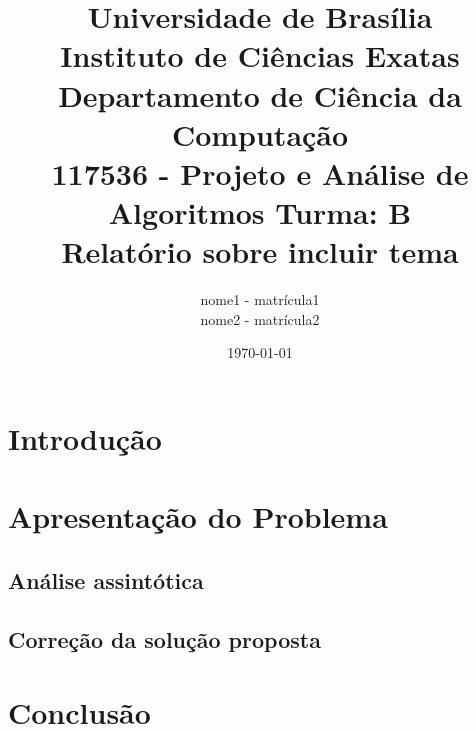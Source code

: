 \documentclass[12pt]{article}
\title{{\large Universidade de Brasília \\ Instituto de Ciências Exatas \\
Departamento de Ciência da Computação} \\[1cm]
117536 - Projeto e Análise de Algoritmos Turma: B\\[.5cm]
Relatório sobre {\bf incluir tema}}
\author{nome1 - matrícula1 \\
        nome2 - matrícula2}
\date{\today}
\begin{document}
\maketitle

\section{Introdução}

\section{Apresentação do Problema}

\subsection{Análise assintótica}

\subsection{Correção da solução proposta}

\section{Conclusão}
\end{document}
